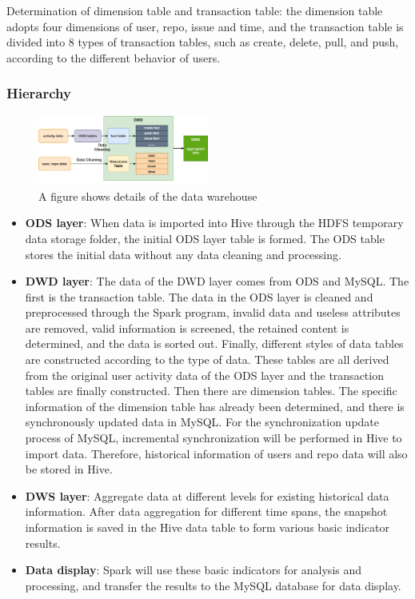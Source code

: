 Determination of dimension table and transaction table: the dimension table adopts four dimensions of user, repo, issue and time, and the transaction table is divided into 8 types of transaction tables, such as create, delete, pull, and push, according to the different behavior of users.




\subsubsection{Hierarchy}


\begin{figure}[H]
    \centering
    \includegraphics[width=0.5\textwidth]{./pic/warehouse.png}
    \caption{A figure shows details of the data warehouse}
    \label{fig:}
\end{figure}

\begin{itemize}
    \item \textbf{ODS layer}: When data is imported into Hive through the HDFS temporary data storage folder, the initial ODS layer table is formed. The ODS table stores the initial data without any data cleaning and processing.
    \item \textbf{DWD layer}: The data of the DWD layer comes from ODS and MySQL. The first is the transaction table. The data in the ODS layer is cleaned and preprocessed through the Spark program, invalid data and useless attributes are removed, valid information is screened, the retained content is determined, and the data is sorted out. Finally, different styles of data tables are constructed according to the type of data. These tables are all derived from the original user activity data of the ODS layer and the transaction tables are finally constructed. Then there are dimension tables. The specific information of the dimension table has already been determined, and there is synchronously updated data in MySQL. For the synchronization update process of MySQL, incremental synchronization will be performed in Hive to import data. Therefore, historical information of users and repo data will also be stored in Hive.
    \item \textbf{DWS layer}: Aggregate data at different levels for existing historical data information. After data aggregation for different time spans, the snapshot information is saved in the Hive data table to form various basic indicator results.
    \item \textbf{Data display}: Spark will use these basic indicators for analysis and processing, and transfer the results to the MySQL database for data display.
\end{itemize}





